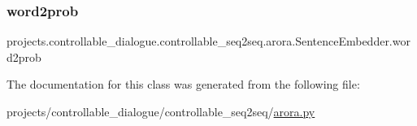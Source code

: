 \subsubsection{\texorpdfstring{word2prob}{word2prob}}
{\footnotesize\ttfamily projects.\+controllable\+\_\+dialogue.\+controllable\+\_\+seq2seq.\+arora.\+Sentence\+Embedder.\+word2prob}



The documentation for this class was generated from the following file\+:\begin{DoxyCompactItemize}
\item 
projects/controllable\+\_\+dialogue/controllable\+\_\+seq2seq/\hyperlink{arora_8py}{arora.\+py}\end{DoxyCompactItemize}
